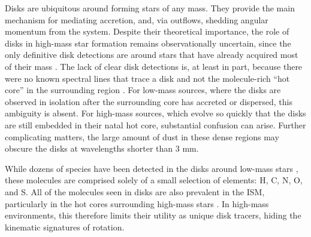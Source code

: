 \documentclass[12pt]{article}
\newcommand{\bam}[1]{\textcolor{green!65!black}{\textbf{[BAM: #1]}}}
\begin{document}

Disks are ubiquitous around forming stars of any mass.  They provide the main
mechanism for mediating accretion, and, via outflows, shedding angular momentum
from the system.  Despite their theoretical importance, the role of disks in
high-mass star formation remains observationally uncertain, since the only
definitive disk detections are around stars that have already acquired most of
their mass \cite{Girart2017a,Ginsburg2018b}.  The lack of clear disk detections
is, at least in part, because there were no known spectral lines that trace a
disk and not the molecule-rich ``hot core'' in the surrounding region
\cite{Goddi2018a,Cesaroni2017a}.  For low-mass sources, where the disks are
observed in isolation after the surrounding core has accreted or dispersed,
this ambiguity is absent.  For high-mass sources, which evolve so quickly that
the disks are still embedded in their natal hot core, substantial confusion can
arise.  Further complicating matters, the large amount of dust in these dense
regions may obscure the disks at wavelengths shorter than 3 mm.

While dozens of species have been detected in the disks around low-mass stars
\cite{McGuire2018c}, these molecules are comprised solely of a small selection
of elements: H, C, N, O, and S.  All of the molecules seen in disks are also
prevalent in the ISM, particularly in the hot cores surrounding high-mass stars
\cite{Nummelin1998a,Belloche2013a}. In high-mass environments, this therefore limits
their utility as unique disk tracers, hiding the kinematic
signatures of rotation.
\end{document}
